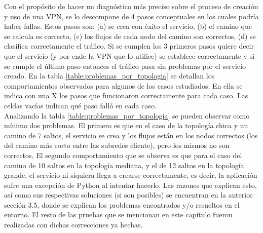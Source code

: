 Con el propósito de hacer un diagnóstico más preciso sobre el proceso de creación y uso de una VPN, se lo descompone de 4 pasos conceptuales en los cuales podría haber fallas. Estos pasos son: (a) se crea con éxito el servicio, (b) el camino que se calcula es correcto, (c) los flujos de cada nodo del camino son correctos, (d) se clasifica correctamente el tráfico. Si se cumplen los 3 primeros pasos quiere decir que el servicio (y por ende la VPN que lo utilice) se establece correctamente y si se cumple el último paso entonces el tráfico pasa sin problemas por el servicio creado. En la tabla \ref{table:problemas_por_topologia} se detallan los comportamientos observados para algunos de los casos estudiados. En ella se indica con una X los pasos que funcionaron correctamente para cada caso. Las celdas vacías indican qué paso falló en cada caso. \\

Analizando la tabla \ref{table:problemas_por_topologia} se pueden observar como mínimo dos problemas. El primero es que en el caso de la topología chica y un camino de 7 saltos, el servicio se crea y los flujos están en los nodos correctos (los del camino más corto entre las subredes cliente), pero los mismos no son correctos. El segundo comportamiento que se observa es que para el caso del camino de 10 saltos en la topología mediana, y el de 12 saltos en la topología grande, el servicio ni siquiera llega a crearse correctamente, es decir, la aplicación sufre una excepción de Python al intentar hacerlo. Las razones que explican esto, así como sus respectivas soluciones (si son posibles) se encuentran en la anterior sección 3.5, donde se explican los problemas encontrados y/o resueltos en el entorno. El resto de las pruebas que se mencionan en este capítulo fueron realizadas con dichas correcciones ya hechas.

